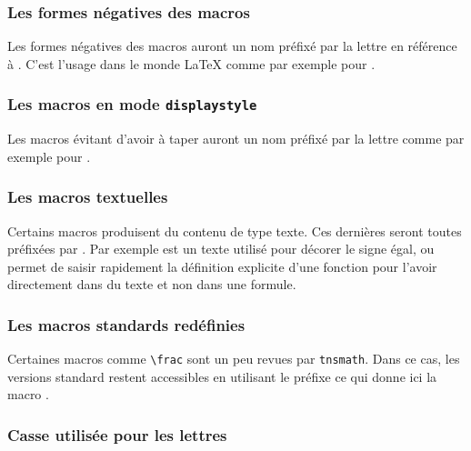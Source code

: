 \documentclass[12pt,a4paper]{book}
\begin{document}


\subsubsection{Les formes \og négatives \fg{} des macros}

Les formes \og négatives \fg{} des macros auront un nom préfixé par la lettre  en référence à . C'est l'usage dans le monde \LaTeX{} comme par exemple pour . 




\subsubsection{Les macros en mode \texttt{displaystyle}}

Les macros évitant d'avoir à taper  auront un nom préfixé par la lettre  comme par exemple pour .




\subsubsection{Les macros \og textuelles \fg}

Certains macros produisent du contenu de type texte. Ces dernières seront toutes préfixées par .
Par exemple  est un texte utilisé pour décorer le signe égal, ou  permet de saisir rapidement la définition explicite d'une fonction pour l'avoir directement dans du texte et non dans une formule.




\subsubsection{Les macros standards redéfinies}

Certaines macros comme \verb+\frac+ sont un peu revues par \verb+tnsmath+.
Dans ce cas, les versions standard restent accessibles en utilisant le préfixe  ce qui donne ici la macro .




\subsubsection{Casse utilisée pour les lettres}
\end{document}
